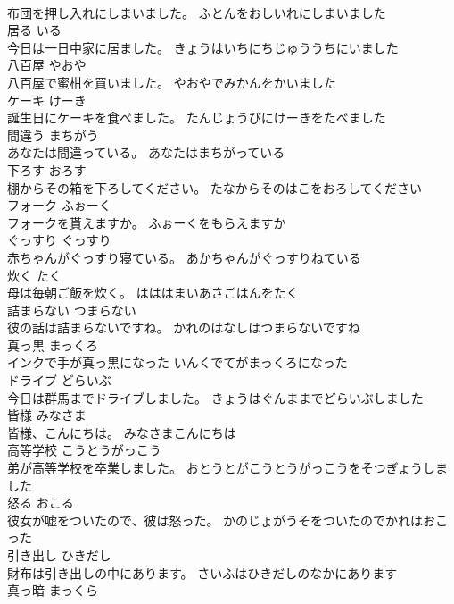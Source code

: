 \documentclass[8pt]{extreport}
\begin{document}
\begin{CJK}{UTF8}{min}
\\	布団を押し入れにしまいました。	ふとんをおしいれにしまいました	
\\	居る	いる	
\\	今日は一日中家に居ました。	きょうはいちにちじゅううちにいました	
\\	八百屋	やおや	
\\	八百屋で蜜柑を買いました。	やおやでみかんをかいました	
\\	ケーキ	けーき	
\\	誕生日にケーキを食べました。	たんじょうびにけーきをたべました	
\\	間違う	まちがう	
\\	あなたは間違っている。	あなたはまちがっている	
\\	下ろす	おろす	
\\	棚からその箱を下ろしてください。	たなからそのはこをおろしてください	
\\	フォーク	ふぉーく	
\\	フォークを貰えますか。	ふぉーくをもらえますか	
\\	ぐっすり	ぐっすり	
\\	赤ちゃんがぐっすり寝ている。	あかちゃんがぐっすりねている	
\\	炊く	たく	
\\	母は毎朝ご飯を炊く。	はははまいあさごはんをたく	
\\	詰まらない	つまらない	
\\	彼の話は詰まらないですね。	かれのはなしはつまらないですね	
\\	真っ黒	まっくろ	
\\	インクで手が真っ黒になった	いんくでてがまっくろになった	
\\	ドライブ	どらいぶ	
\\	今日は群馬までドライブしました。	きょうはぐんままでどらいぶしました	
\\	皆様	みなさま	
\\	皆様、こんにちは。	みなさまこんにちは	
\\	高等学校	こうとうがっこう	
\\	弟が高等学校を卒業しました。	おとうとがこうとうがっこうをそつぎょうしました	
\\	怒る	おこる	
\\	彼女が嘘をついたので、彼は怒った。	かのじょがうそをついたのでかれはおこった	
\\	引き出し	ひきだし	
\\	財布は引き出しの中にあります。	さいふはひきだしのなかにあります	
\\	真っ暗	まっくら	

\end{CJK}
\end{document}
